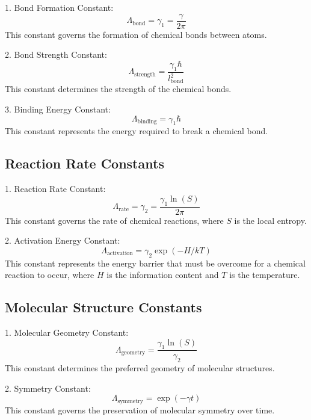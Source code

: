 \documentclass{article}
\theoremstyle{plain}
\theoremstyle{definition}
\theoremstyle{remark}
\begin{document}
1. Bond Formation Constant:
   \begin{equation}
   \Lambda_\text{bond} = \gamma_1 = \frac{\gamma}{2\pi}
   \end{equation}
   This constant governs the formation of chemical bonds between atoms.

2. Bond Strength Constant:
   \begin{equation}
   \Lambda_\text{strength} = \frac{\gamma_1\hbar}{l_\text{bond}^2}
   \end{equation}
   This constant determines the strength of the chemical bonds.

3. Binding Energy Constant:
   \begin{equation}
   \Lambda_\text{binding} = \gamma_1\hbar
   \end{equation}
   This constant represents the energy required to break a chemical bond.

\subsection{Reaction Rate Constants}

1. Reaction Rate Constant:
   \begin{equation}
   \Lambda_\text{rate} = \gamma_2 = \frac{\gamma_1\ln(S)}{2\pi}
   \end{equation}
   This constant governs the rate of chemical reactions, where $S$ is the local entropy.

2. Activation Energy Constant:
   \begin{equation}
   \Lambda_\text{activation} = \gamma_2\exp(-H/kT)
   \end{equation}
   This constant represents the energy barrier that must be overcome for a chemical reaction to occur, where $H$ is the information content and $T$ is the temperature.

\subsection{Molecular Structure Constants}

1. Molecular Geometry Constant:
   \begin{equation}
   \Lambda_\text{geometry} = \frac{\gamma_1\ln(S)}{\gamma_2}
   \end{equation}
   This constant determines the preferred geometry of molecular structures.

2. Symmetry Constant:
   \begin{equation}
   \Lambda_\text{symmetry} = \exp(-\gamma t)
   \end{equation}
   This constant governs the preservation of molecular symmetry over time.
\end{document}
